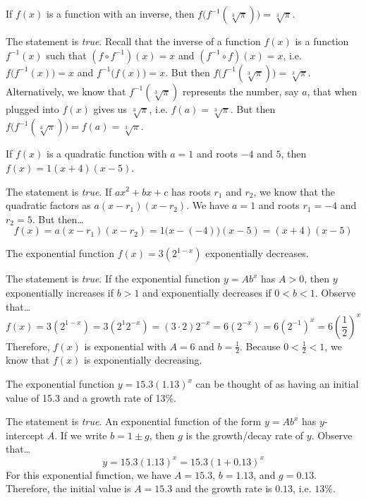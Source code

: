 \documentclass[11pt,letterpaper]{article}
\begin{document}
 If $f(x)$ is a function with an inverse, then $f \big( f^{-1}( \sqrt[3]{\pi} ) \big)= \sqrt[3]{\pi}$. \pspace

\sol The statement is \textit{true}. Recall that the inverse of a function $f(x)$ is a function $f^{-1}(x)$ such that $(f \circ f^{-1})(x)= x$ and $(f^{-1} \circ f)(x)= x$, i.e. $f \big( f^{-1}(x) \big)= x$ and $f^{-1} \big( f(x) \big)= x$. But then $f \big( f^{-1}( \sqrt[3]{\pi} ) \big)= \sqrt[3]{\pi}$. Alternatively, we know that $f^{-1}( \sqrt[3]{\pi} )$ represents the number, say $a$, that when plugged into $f(x)$ gives us $\sqrt[3]{\pi}$, i.e. $f(a)= \sqrt[3]{\pi}$. But then $f \big( f^{-1}( \sqrt[3]{\pi} ) \big)= f(a)= \sqrt[3]{\pi}$. \pvspace{1.3cm}



 If $f(x)$ is a quadratic function with $a= 1$ and roots $-4$ and $5$, then $f(x)= 1(x + 4)(x - 5)$. \pspace

\sol The statement is \textit{true}. If $ax^2 + bx + c$ has roots $r_1$ and $r_2$, we know that the quadratic factors as $a(x - r_1)(x - r_2)$. We have $a= 1$ and roots $r_1= -4$ and $r_2= 5$. But then\dots
	\[
	f(x)= a(x - r_1)(x - r_2)= 1 \big(x - (-4) \big)(x - 5)= (x + 4)(x - 5)
	\] \pvspace{1.3cm}



 The exponential function $f(x)= 3(2^{1-x})$ exponentially decreases. \pspace

\sol The statement is \textit{true}. If the exponential function $y= Ab^x$ has $A > 0$, then $y$ exponentially increases if $b > 1$ and exponentially decreases if $0 < b < 1$. Observe that\dots
	\[
	f(x)= 3(2^{1-x})= 3 \left( 2^1 2^{-x} \right)= (3 \cdot 2) 2^{-x}= 6 (2^{-x})= 6(2^{-1})^x= 6 \left( \dfrac{1}{2} \right)^x
	\] 
Therefore, $f(x)$ is exponential with $A= 6$ and $b= \frac{1}{2}$. Because $0 < \frac{1}{2} < 1$, we know that $f(x)$ is exponentially decreasing. \pvspace{1.3cm}



 The exponential function $y= 15.3 (1.13)^x$ can be thought of as having an initial value of 15.3 and a growth rate of 13\%. \pspace

\sol The statement is \textit{true}. An exponential function of the form $y= Ab^x$ has $y$-intercept $A$. If we write $b= 1 \pm g$, then $g$ is the growth/decay rate of $y$. Observe that\dots
	\[
	y= 15.3 (1.13)^x= 15.3(1 + 0.13)^x
	\] 
For this exponential function, we have $A= 15.3$, $b= 1.13$, and $g= 0.13$. Therefore, the initial value is $A= 15.3$ and the growth rate is $0.13$, i.e. $13\%$. \pvspace{1.3cm}
\end{document}
